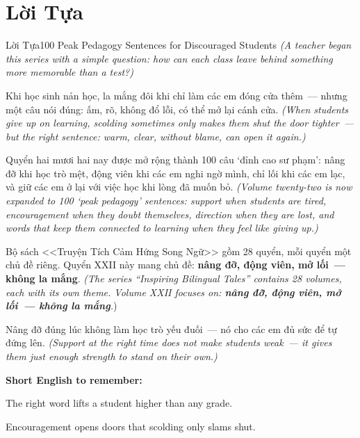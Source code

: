 \chapter*{Lời Tựa}

\begin{truyen}{Lời Tựa}{100 Peak Pedagogy Sentences for Discouraged Students}
\textit{(A teacher began this series with a simple question: how can each class leave behind something more memorable than a test?)}

Khi học sinh nản học, la mắng đôi khi chỉ làm các em đóng cửa thêm~--- nhưng một câu nói đúng: ấm, rõ, không đổ lỗi, có thể mở lại cánh cửa.
\textit{(When students give up on learning, scolding sometimes only makes them shut the door tighter~--- but the right sentence: warm, clear, without blame, can open it again.)}

Quyển hai mươi hai nay được mở rộng thành 100 câu `đỉnh cao sư phạm': nâng đỡ khi học trò mệt, động viên khi các em nghi ngờ mình, chỉ lối khi các em lạc, và giữ các em ở lại với việc học khi lòng đã muốn bỏ.
\textit{(Volume twenty-two is now expanded to 100 `peak pedagogy' sentences: support when students are tired, encouragement when they doubt themselves, direction when they are lost, and words that keep them connected to learning when they feel like giving up.)}

Bộ sách <<Truyện Tích Cảm Hứng Song Ngữ>> gồm 28 quyển, mỗi quyển một chủ đề riêng. Quyển XXII này mang chủ đề: \textbf{nâng đỡ, động viên, mở lối~--- không la mắng}.
\textit{(The series ``Inspiring Bilingual Tales'' contains 28 volumes, each with its own theme. Volume XXII focuses on: \textbf{nâng đỡ, động viên, mở lối~--- không la mắng}.})
\end{truyen}

\begin{baihoc}
Nâng đỡ đúng lúc không làm học trò yếu đuối~--- nó cho các em đủ sức để tự đứng lên.
\textit{(Support at the right time does not make students weak~--- it gives them just enough strength to stand on their own.)}
\end{baihoc}

\begin{ghinhoanh}
\textbf{Short English to remember:}

The right word lifts a student higher than any grade.

Encouragement opens doors that scolding only slams shut.
\end{ghinhoanh}

